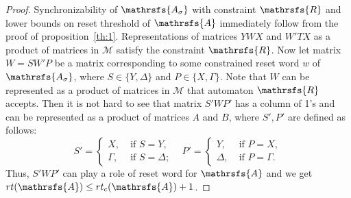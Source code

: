 \documentclass[11pt]{llncs}
\newcommand{\A}{\mathrsfs{A}}
\newcommand{\R}{\mathrsfs{R}}
\newcommand{\AD}{\mathrsfs{A_{\sigma}}}
\newcommand{\G}{\Gamma}
\newcommand{\D}{\Delta}
\newcommand{\rt}{rt}
\newcommand{\rtc}{rt_{c}}
\begin{document}
\begin{proof}
Synchronizability of $\AD$ with constraint $\R$ and lower bounds on reset threshold of $\A$ immediately 
follow from the proof of proposition~\ref{th:1}.
Representations of matrices $YWX$ and $W'TX$ as a product of matrices in $\mathcal{M}$ satisfy the
constraint $\R$.
Now let matrix $W = SW'P$ be a matrix corresponding to some constrained reset word $w$ of $\AD$, where $S \in \{Y, \D\}$
and $P \in \{ X, \G\}$. Note that $W$ can be represented as a product of matrices in $\mathcal{M}$ that automaton $\R$ 
accepts.
Then it is not hard to see that matrix $S'WP'$ has a column of 1's and can be represented as
a product of matrices $A$ and $B$, where $S',P'$ are defined as follows:
$$
S' = 
\begin{cases}
X,\;& \mbox{if } S = Y,\\
\G,\;& \mbox{if } S = \D;
\end{cases}\;\;\;
P' = 
\begin{cases}
Y,\;& \mbox{if } P = X,\\
\D,\;& \mbox{if } P = \G.
\end{cases}
$$
Thus, $S'WP'$ can play a role of reset word for $\A$ and we get $\rt(\A) \leq \rtc(\A) + 1$.
\end{proof}
\end{document}
